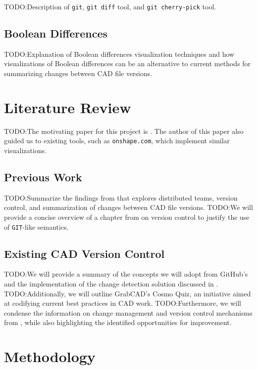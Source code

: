 \documentclass[sigconf,authorversion,nonacm]{acmart}
\begin{document}
TODO:Description of \texttt{git}, \texttt{git diff} tool, and \texttt{git cherry-pick} tool.

\subsection{Boolean Differences}

TODO:Explanation of Boolean differences visualization techniques and how visualizations of Boolean differences can be an alternative to current methods for summarizing changes between CAD file versions.

\section{Literature Review}

TODO:The motivating paper for this project is \citet{cheng2023age}. The author of this paper also guided us to existing tools, such as \texttt{onshape.com}, which implement similar visualizations.

\subsection{Previous Work}

TODO:Summarize the findings from \citet{cheng2023age}  that explores distributed teams, version control, and summarization of changes between CAD file versions.
TODO:We will provide a concise overview of a chapter from \citet{Frazelle_2021} on version control to justify the use of \texttt{GIT}-like semantics.

\subsection{Existing CAD Version Control}

TODO:We will provide a summary of the concepts we will adopt from GitHub's \citet{github_blog_2013} and the implementation of the change detection solution discussed in \citet{3drepo_blog}.
TODO:Additionally, we will outline GrabCAD's Cosmo Quiz\cite{revisions_2014}, an initiative aimed at codifying current best practices in CAD work.
TODO:Furthermore, we will condense the information on change management and version control mechanisms from \citet{Bricogne_Rivest_Troussier_Eynard_2012}, while also highlighting the identified opportunities for improvement.

\section{Methodology}
\end{document}
